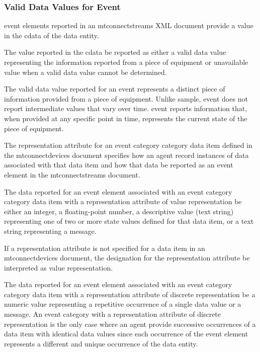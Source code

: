 \documentclass{mtconnect}	%
\begin{document}
\subsubsection{Valid Data Values for Event}

\gls{event} elements reported in an \gls{mtconnectstreams} XML document \must provide a value in the \gls{cdata} of the \gls{data entity}.

The value reported in the \gls{cdata} \must be reported as either a \gls{valid data value} representing the information reported from a piece of equipment or \gls{unavailable value} when a \gls{valid data value} cannot be determined.

The \gls{valid data value} reported for an \gls{event} represents a distinct piece of information provided from a piece of equipment.  Unlike \gls{sample}, \gls{event} does not report intermediate values that vary over time.  \gls{event} reports information that, when provided at any specific point in time, represents the current state of the piece of equipment.

The \gls{representation} attribute for an \gls{event category} category data item defined in the \gls{mtconnectdevices} document specifies how an \gls{agent} \must record instances of data associated with that data item and how that data \must be reported as an \gls{event} element in the \gls{mtconnectstreams} document.

The data reported for an \gls{event} element associated with an \gls{event category} category data item with a \gls{representation} attribute of \gls{value representation} \must be either an integer, a floating-point number, a descriptive value (text string) representing one of two or more state values defined for that data item, or a text string representing a message.

If a \gls{representation} attribute is not specified for a data item in an \gls{mtconnectdevices} document, the designation for the \gls{representation} attribute \must be interpreted as \gls{value representation}.

The data reported for an \gls{event} element associated with an \gls{event category} category data item with a \gls{representation} attribute of \gls{discrete representation} \must be a numeric value representing a repetitive occurrence of a single data value or a message.   An \gls{event category} with a \gls{representation} attribute of \gls{discrete representation} is the only case where an \gls{agent} \may provide successive occurrences of a data item with identical data values since each occurrence of the \gls{event} element represents a different and unique occurrence of the \gls{data entity}.
\end{document}
